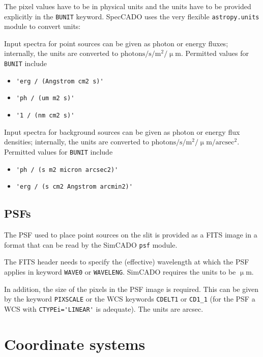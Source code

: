 \documentclass[a4paper,twoside,11pt]{article}
\newcommand{\micron}{\upmu\mathrm{m}}
\begin{document}
The pixel values have to be in physical units and the units have to be
provided explicitly in the \lstinline{BUNIT} keyword. SpecCADO uses
the very flexible \lstinline{astropy.units} module to convert units:

Input spectra for point sources can be given as photon or energy
fluxes; internally, the units are converted to
$\mathrm{photons}/\mathrm{s}/\mathrm{m^{2}}/\micron$.  Permitted
values for \lstinline{BUNIT} include
\begin{itemize}
\item \lstinline{'erg / (Angstrom cm2 s)'}
\item \lstinline{'ph / (um m2 s)'}
\item \lstinline{'1 / (nm cm2 s)'}
\end{itemize}

Input spectra for background sources can be given as photon or energy
flux densities; internally, the units are converted to
$\mathrm{photons}/\mathrm{s}/\mathrm{m^{2}}/\micron/\mathrm{arcsec^{2}}$. Permitted
values for \lstinline{BUNIT} include
\begin{itemize}
\item \lstinline{'ph / (s m2 micron arcsec2)'}
\item \lstinline{'erg / (s cm2 Angstrom arcmin2)'}
\end{itemize}

\subsection{PSFs}
\label{ssec:input_psf}

The PSF used to place point sources on the slit is provided as a FITS
image in a format that can be read by the SimCADO \lstinline{psf}
module.

The FITS header needs to specify the (effective) wavelength at which
the PSF applies in keyword \lstinline{WAVE0} or
\lstinline{WAVELENG}. SimCADO requires the units to be $\micron$.

In addition, the size of the pixels in the PSF image is required. This
can be given by the keyword \lstinline{PIXSCALE} or the WCS keywords
\lstinline{CDELT1} or \lstinline{CD1_1} (for the PSF a WCS with
\lstinline{CTYPEi='LINEAR'} is adequate). The units are arcsec.


\section{Coordinate systems}
\label{sec:coordinates}
\end{document}
